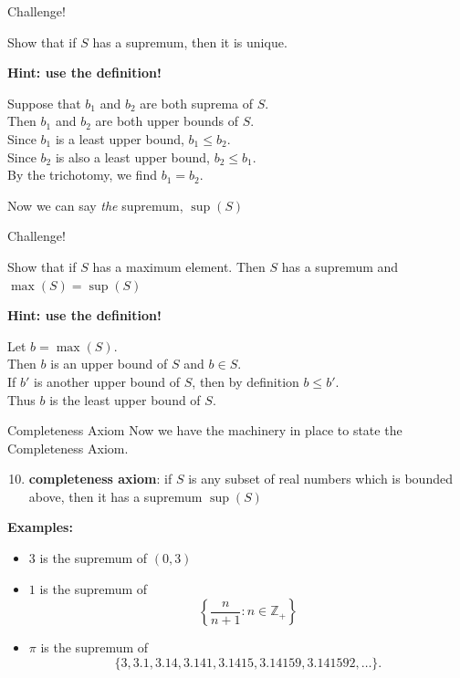 \documentclass{beamer}
\begin{document}
\begin{frame}{Challenge!}
\begin{prob}
Show that if $S$ has a supremum, then it is unique.
\end{prob}
\pause
\textbf{Hint: use the definition!}
\pause
\begin{soln}
Suppose that $b_1$ and $b_2$ are both suprema of $S$.\\
\pause
Then $b_1$ and $b_2$ are both upper bounds of $S$.\\
\pause
Since $b_1$ is a least upper bound, $b_1\leq b_2$.\\
\pause
Since $b_2$ is also a least upper bound, $b_2\leq b_1$.\\
\pause
By the trichotomy, we find $b_1=b_2$.
\end{soln}
\pause
Now we can say \emph{the} supremum, $\sup(S)$
\end{frame}

\begin{frame}{Challenge!}
\begin{prob}
Show that if $S$ has a maximum element.  Then $S$ has a supremum and $\max(S)=\sup(S)$
\end{prob}
\pause
\textbf{Hint: use the definition!}
\pause
\begin{soln}
Let $b=\max(S)$.\\
\pause
Then $b$ is an upper bound of $S$ and $b\in S$.\\
\pause
If $b'$ is another upper bound of $S$, then by definition $b\leq b'$.\\
\pause
Thus $b$ is the least upper bound of $S$.
\end{soln}
\end{frame}

\begin{frame}{Completeness Axiom}
Now we have the machinery in place to state the Completeness Axiom.
\pause
\begin{enumerate}[\text{A}1]
\setcounter{enumi}{9}
\pause
\item \textbf{completeness axiom}: if $S$ is any subset of real numbers which is bounded above, then it has a supremum $\sup(S)$
\end{enumerate}
\pause
\textbf{Examples:}
\begin{itemize}
\pause
\item $3$ is the supremum of $(0,3)$
\pause
\item $1$ is the supremum of
$$\left\lbrace
\frac{n}{n+1}: n\in\mathbb{Z}_+
\right\rbrace$$
\pause
\item $\pi$ is the supremum of
$$\{3,3.1,3.14,3.141,3.1415,3.14159,3.141592,\dots\}.$$
\end{itemize}
\end{frame}
\end{document}
